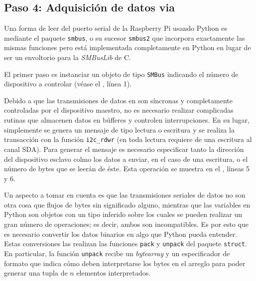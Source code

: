 %
%



\subsection{Paso 4: Adquisición de datos via \IIC}%
\label{sec:step4}

Una forma de leer del puerto serial \IIC{} de la Raspberry Pi usando Python es mediante el paquete \texttt{smbus}, o su sucesor \texttt{smbus2} que incorpora exactamente las mismas funciones pero está implementada completamente en Python en lugar de ser un envoltorio para la \emph{SMBusLib} de C.

El primer paso es instanciar un objeto de tipo \texttt{SMBus} indicando el número de dispositivo a controlar (véase el , línea 1).



Debido a que las transmisiones de datos en \IIC{} son síncronas y completamente controladas por el dispositivo maestro, no es necesario realizar complicadas rutinas que almacenen datos en búfferes y controlen interrupciones.
En su lugar, simplemente se genera un mensaje \IIC{} de tipo lectura o escritura y se realiza la transacción con la función \texttt{i2c\_rdwr} (en \IIC{} toda lectura requiere de una escritura al canal SDA).
Para generar el mensaje es necesario especificar tanto la dirección del dispositivo esclavo colmo los datos a enviar, en el caso de una escritura, o el número de bytes que se leerán de éste.
Esta operación se muestra en el , líneas 5 y 6.

Un aspecto a tomar en cuenta es que las transmisiones seriales de datos no son otra cosa que flujos de bytes sin significado alguno, mientras que las variables en Python son objetos con un tipo inferido sobre los cuales se pueden realizar un gran número de operaciones; es decir, ambos son incompatibles.
Es por esto que es necesario convertir los datos binarios en algo que Python pueda entender.
Estas conversiones las realizan las funciones \texttt{pack} y \texttt{unpack} del paquete \texttt{struct}.
En particular, la función \texttt{unpack} recibe un \textit{bytearray} y un especificador de formato que indica cómo deben interpretarse los bytes en el arreglo para poder generar una tupla de $n$ elementos interpretados.

